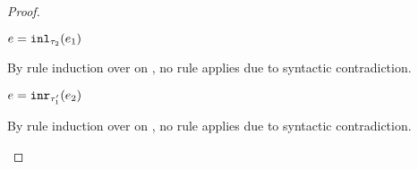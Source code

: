 \begin{proof}
\begin{byCases}
\begin{byCases}
\begin{byCases}
        \begin{pfsteps*}
        \item $e=\mathtt{inl}_{\tau_2}({e_1})$ 
        \end{pfsteps*} 
        By rule induction over  on , no rule applies due to syntactic contradiction.
        \item[\text{(\ref{rule:IInr})}] 
        \begin{pfsteps*}
        \item $e=\mathtt{inr}_{\tau_1'}({e_2})$ 
        \end{pfsteps*} 
        By rule induction over  on , no rule applies due to syntactic contradiction.
      \end{byCases}
    \end{byCases}


\end{byCases}
\end{proof}
